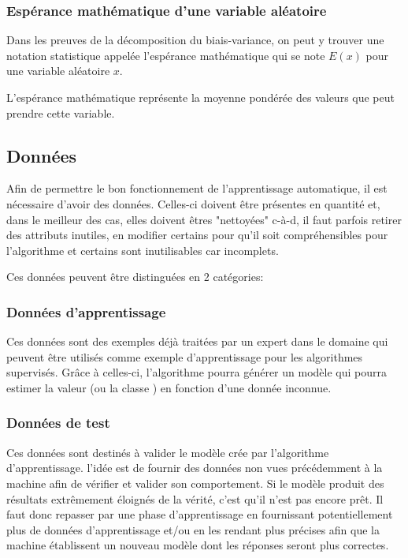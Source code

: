 \documentclass[a4paper]{article}
\begin{document}
\subsubsection{Espérance mathématique d'une variable aléatoire}
Dans les preuves de la décomposition du biais-variance, on peut y trouver une notation statistique appelée l'espérance mathématique qui se note $ E(x) $ pour une variable aléatoire $x$. \newline

L'espérance mathématique représente la moyenne pondérée des valeurs que peut prendre cette variable. 

\newpage

\subsection{Données}
\label{Data}
Afin de permettre le bon fonctionnement de l'apprentissage automatique, il est nécessaire d'avoir des données. Celles-ci doivent être présentes en quantité et, dans le meilleur des cas, elles doivent êtres "nettoyées" c-à-d, il faut parfois retirer des attributs inutiles, en modifier certains pour qu'il soit compréhensibles pour l'algorithme et certains sont inutilisables car incomplets. \newline

Ces données peuvent être distinguées en 2 catégories:

\subsubsection{Données d'apprentissage}
Ces données sont des exemples déjà traitées par un expert dans le domaine qui peuvent être utilisés comme exemple d'apprentissage pour les algorithmes supervisés. Grâce à celles-ci, l'algorithme pourra générer un modèle qui pourra estimer la valeur (ou la classe ) en fonction d'une donnée inconnue.

\subsubsection{Données de test}
Ces données sont destinés à valider le modèle crée par l'algorithme d'apprentissage. l'idée est de fournir des données non vues précédemment à la machine afin de vérifier et valider son comportement. Si le modèle produit des résultats extrêmement éloignés de la vérité, c'est qu'il n'est pas encore prêt. Il faut donc repasser par une phase d'apprentissage en fournissant potentiellement plus de données d'apprentissage et/ou en les rendant plus précises afin que la machine établissent un nouveau modèle dont les réponses seront plus correctes.
\end{document}
